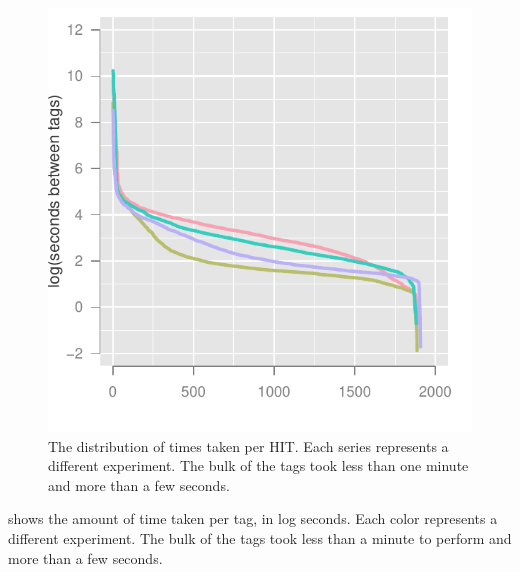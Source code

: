 \begin{figure}
\centering
\includegraphics[width = .75\linewidth]{figures/hit_times}
\caption{The distribution of times taken per HIT.  Each series represents a different experiment.  The bulk of the tags took less than one minute and more than a few seconds.}
\label{fig:times}
\end{figure}

 shows the amount of time taken per tag, in log
seconds. Each color represents a different experiment.  The bulk of
the tags took less than a minute to perform and more than a few
seconds.

